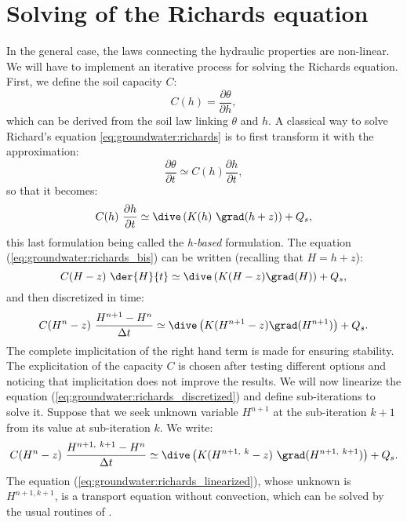 \section{Solving of the Richards equation}\label{sec:groundwater:solving_richards}

In the general case, the laws connecting the hydraulic properties are non-linear.
We will have to implement an iterative process for solving the Richards equation.
First, we define the soil capacity $C$:
\begin{equation}
 \label{eq:groundwater:c_definition}
  C(h) = \frac{\partial \theta}{\partial h},
\end{equation}
which can be derived from the soil law linking $\theta$ and $h$.
A classical way to solve Richard's equation \eqref{eq:groundwater:richards} is
to first transform it with the approximation:
\begin{equation}
\label{approximation}
\frac{\partial \theta}{\partial t} \simeq C(h) \frac{\partial h}{\partial t},
\end{equation}
so that it becomes:
\begin{equation}
\label{eq:groundwater:richards_bis}
 C(h) \ \dfrac{\partial{h}}{\partial{t}} \simeq \dive \left( K(h) \ \grad(h + z) \right) + Q_s,
\end{equation}
this last formulation being called the \textit{h-based} formulation.
The equation (\ref{eq:groundwater:richards_bis}) can be written (recalling that $H = h + z$):
\begin{equation}
\label{eq:groundwater:richards_ter}
 C(H-z) \ \der{H}{t} \simeq \dive \left( K(H-z) \grad(H) \right) + Q_s,
\end{equation}
and then discretized in time:
\begin{equation}
\label{eq:groundwater:richards_discretized}
 C(H^{n}-z) \ \frac{ H^{n+1} - H^n }{\Delta t} \simeq \dive \left( K(H^{n+1}-z) \grad(H^{n+1}) \right) + Q_s.
\end{equation}
The complete implicitation of the right hand term is made for ensuring stability. The explicitation of the capacity $C$
is chosen after testing different options and noticing that implicitation does not improve the results.
We will now linearize the equation (\ref{eq:groundwater:richards_discretized}) and define sub-iterations to solve it.
Suppose that we seek unknown variable $H^{n+1}$ at the sub-iteration $k+1$ from its value at sub-iteration $k$.
We write:
\begin{equation}
\label{eq:groundwater:richards_linearized}
 C(H^{n}-z) \ \frac{H^{n+1, \ k+1} - H^n}{\Delta t} \simeq \dive \left( K(H^{n+1, \ k} - z) \ \grad(H^{n+1, \ k+1}) \right) + Q_s.
\end{equation}
The equation (\ref{eq:groundwater:richards_linearized}), whose unknown is $H^{n+1, k+1}$,
is a transport equation without convection, which can be solved by the usual routines of \CS.


